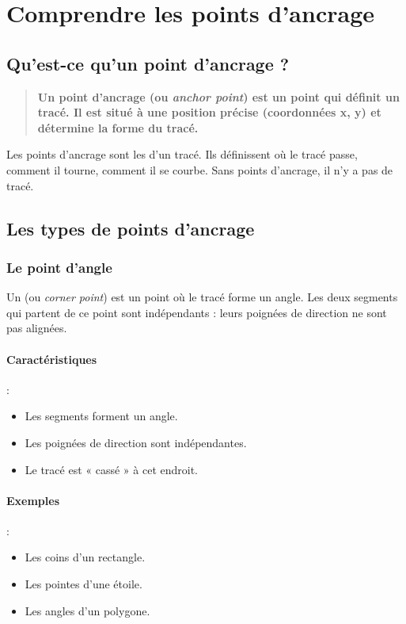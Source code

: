 \section{Comprendre les points d'ancrage}

\subsection{Qu'est-ce qu'un point d'ancrage ?}

\begin{quote}
\textbf{Un point d'ancrage (ou \emph{anchor point}) est un point qui définit un tracé. Il est situé à une position précise (coordonnées x, y) et détermine la forme du tracé.}
\end{quote}

Les points d'ancrage sont les  d'un tracé. Ils définissent où le tracé passe, comment il tourne, comment il se courbe. Sans points d'ancrage, il n'y a pas de tracé.

\subsection{Les types de points d'ancrage}

\subsubsection{Le point d'angle}

Un  (ou \emph{corner point}) est un point où le tracé forme un angle. Les deux segments qui partent de ce point sont indépendants : leurs poignées de direction ne sont pas alignées.

\paragraph{Caractéristiques} :
\begin{itemize}
    \item Les segments forment un angle.
    \item Les poignées de direction sont indépendantes.
    \item Le tracé est « cassé » à cet endroit.
\end{itemize}

\paragraph{Exemples} :
\begin{itemize}
    \item Les coins d'un rectangle.
    \item Les pointes d'une étoile.
    \item Les angles d'un polygone.
\end{itemize}

